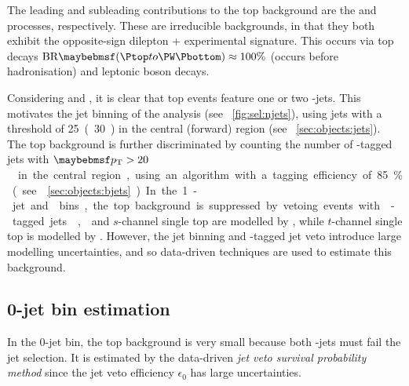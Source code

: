 
The leading and subleading contributions to the top background are the \ttbar and 
\HepProcess{\PW\Ptop} processes, respectively. These are irreducible backgrounds, in that 
they both exhibit the opposite-sign dilepton + \met experimental signature. This occurs via 
top decays $\text{BR}\parenths{\HepProcess{\Ptop \HepTo \PW\Pbottom}} \approx 100\%$ 
(occurs before hadronisation) and leptonic \PW boson decays.

Considering \HepProcess{\ttbar \HepTo \PW\PW\Pbottom\Pbottom} and \HepProcess{\PW\Ptop 
\HepTo \PW\PW\Pbottom}, it is clear that top events feature one or two \Pbottom-jets. This 
motivates the jet binning of the \HWW analysis (see \Figure~\ref{fig:sel:njets}), using 
jets with a \pt threshold of \unit{25(30)}{\GeV} in the central (forward) region (see 
\Section~\ref{sec:objects:jets}). The top background is further discriminated by counting 
the number of \Pbottom-tagged jets with \unit{$\pt > 20$}{\GeV} in the central region, 
using an algorithm with a tagging efficiency of 85\% (see \Section~\ref{sec:objects:bjets}).
In the 1-jet and \twojet bins, the top background is suppressed by vetoing events with 
\Pbottom-tagged jets.

\ttbar, \HepProcess{\PW\Ptop} and $s$-channel single top are modelled by 
, while $t$-channel single top is modelled by 
. However, the jet binning and \Pbottom-tagged jet veto 
introduce large modelling uncertainties, and so data-driven techniques are used to 
estimate this background.



\subsection{0-jet bin estimation}
\label{sec:top:0j}

In the 0-jet bin, the top background is very small because both \Pbottom-jets must fail the 
jet selection. It is estimated by the data-driven \textit{jet veto survival probability 
method} since the jet veto efficiency $\epsilon_0$ has large uncertainties.

